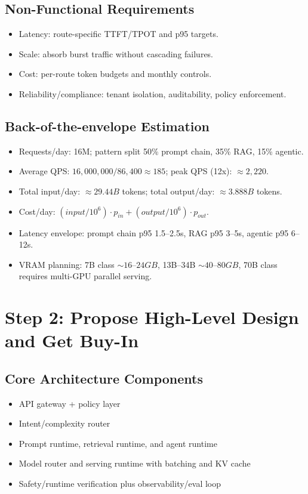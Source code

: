 \subsection*{Non-Functional Requirements}
\begin{itemize}
  \item Latency: route-specific TTFT/TPOT and p95 targets.
  \item Scale: absorb burst traffic without cascading failures.
  \item Cost: per-route token budgets and monthly controls.
  \item Reliability/compliance: tenant isolation, auditability, policy enforcement.
\end{itemize}

\subsection*{Back-of-the-envelope Estimation}
\begin{itemize}
  \item Requests/day: 16M; pattern split 50\% prompt chain, 35\% RAG, 15\% agentic.
  \item Average QPS: $16,000,000/86,400 \approx 185$; peak QPS (12x): $\approx 2,220$.
  \item Total input/day: $\approx 29.44B$ tokens; total output/day: $\approx 3.888B$ tokens.
  \item Cost/day: $(input/10^6)\cdot p_{in} + (output/10^6)\cdot p_{out}$.
  \item Latency envelope: prompt chain p95 1.5--2.5s, RAG p95 3--5s, agentic p95 6--12s.
  \item VRAM planning: 7B class $\sim 16$--$24GB$, 13B--34B $\sim 40$--$80GB$, 70B class requires multi-GPU parallel serving.
\end{itemize}

\section*{Step 2: Propose High-Level Design and Get Buy-In}
\subsection*{Core Architecture Components}
\begin{itemize}
  \item API gateway + policy layer
  \item Intent/complexity router
  \item Prompt runtime, retrieval runtime, and agent runtime
  \item Model router and serving runtime with batching and KV cache
  \item Safety/runtime verification plus observability/eval loop
\end{itemize}

